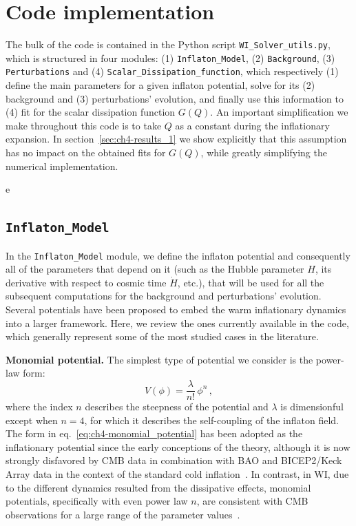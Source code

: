 \section{Code implementation \label{sec:ch4-code}}

The bulk of the code is contained in the Python script \texttt{WI\_Solver\_utils.py}, which  is structured in four modules: (1) \texttt{Inflaton\_Model}, (2) \texttt{Background}, (3) \texttt{Perturbations} and (4) \texttt{Scalar\_Dissipation\_function}, which respectively (1) define the main parameters for a given inflaton potential, solve for its (2) background and (3) perturbations' evolution, and finally use this information to (4) fit for the scalar dissipation function $G(Q)$. An important simplification we make throughout this code is to take $Q$ as a constant during the inflationary expansion. In section~\ref{sec:ch4-results_1} we show explicitly that this assumption has no impact on the obtained fits for $G(Q)$, while greatly simplifying the numerical implementation.

e\subsection{\texttt{Inflaton\_Model}}
\label{sec:ch4-Inflaton_Model}

In the \texttt{Inflaton\_Model} module, we define the inflaton potential and consequently all of the parameters that depend on it (such as the Hubble parameter $H$, its derivative with respect to cosmic time $\Dot{H}$, etc.), that will be used for all the subsequent computations for the background and perturbations' evolution. Several potentials have been proposed to embed the warm inflationary dynamics into a larger framework. Here, we review the ones currently available in the code, which generally represent some of the most studied cases in the literature.

{\bf Monomial potential.} The simplest type of potential we consider is the power-law form:
\begin{equation}
    \label{eq:ch4-monomial_potential}
    V(\phi)= \frac{\lambda}{n!}\,\phi^n\,,
\end{equation}
where the index $n$ describes the steepness of the potential and $\lambda$ is dimensionful except when $n=4$, for which it describes the self-coupling of the inflaton field. The form in eq.~\eqref{eq:ch4-monomial_potential} has been adopted as the inflationary potential since the early conceptions of the theory, although it is now strongly disfavored by CMB data in combination with BAO and BICEP2/Keck Array data in the context of the standard cold inflation~\cite{Planck:2018jri}. In contrast, in WI, due to the different dynamics resulted
from the dissipative effects, monomial potentials, specifically with even  power law $n$, are consistent with CMB observations for a
large range of the parameter values~\cite{Benetti:2016jhf}.

